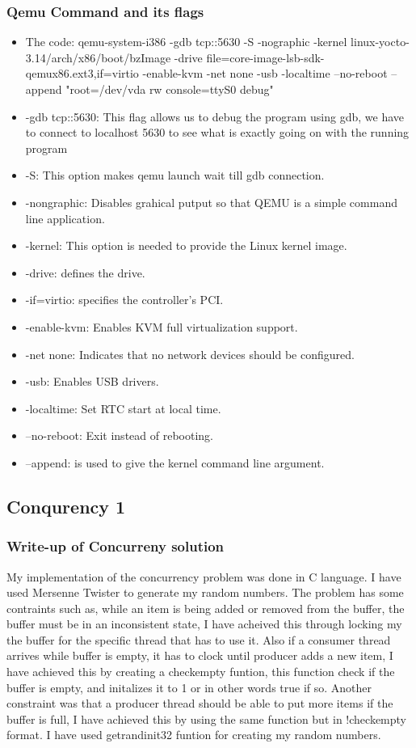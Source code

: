 \documentclass[letterpaper,10pt,draftclsnofoot,onecolumn]{IEEEtran}
\begin{document}
\subsubsection*{Qemu Command and its flags} 
\begin{itemize}
	\item The code: qemu-system-i386 -gdb tcp::5630 -S -nographic -kernel linux-yocto-3.14/arch/x86/boot/bzImage -drive file=core-image-lsb-sdk-qemux86.ext3,if=virtio -enable-kvm -net none -usb -localtime --no-reboot --append "root=/dev/vda rw console=ttyS0 debug" 
	\item -gdb tcp::5630: This flag allows us to debug the program using gdb, we have to connect to localhost 5630 to see what is exactly going on with the running program 
	\item -S: This option makes qemu launch wait till gdb connection. 
	\item -nongraphic: Disables grahical putput so that QEMU is a simple command line application.
	\item -kernel: This option is needed to provide the Linux kernel image.
	\item -drive: defines the drive. 
	\item -if=virtio: specifies the controller's PCI. 
	\item -enable-kvm: Enables KVM full virtualization support. 
	\item -net none: Indicates that no network devices should be configured. 
	\item -usb: Enables USB drivers.
	\item -localtime: Set RTC start at local time. 
	\item --no-reboot: Exit instead of rebooting. 
	\item --append: is used to give the kernel command line argument. 
\end{itemize}

\subsection*{Conqurency 1}

\subsubsection*{Write-up of Concurreny solution}

My implementation of the concurrency problem was done in C language. I have used Mersenne Twister to generate my random numbers. The problem has some contraints such as, while an item is being added or removed from the buffer, the buffer must be in an inconsistent state, I have acheived this through locking my the buffer for the specific thread that has to use it. Also if a consumer thread arrives while buffer is empty, it has to clock until producer adds a new item, I have achieved this by creating a checkempty funtion, this function check if the buffer is empty, and initalizes it to 1 or in other words true if so. Another constraint was that a producer thread should be able to put more items if the buffer is full, I have achieved this by using the same function but in !checkempty format. I have used getrandinit32 funtion for creating my random numbers.
\end{document}
